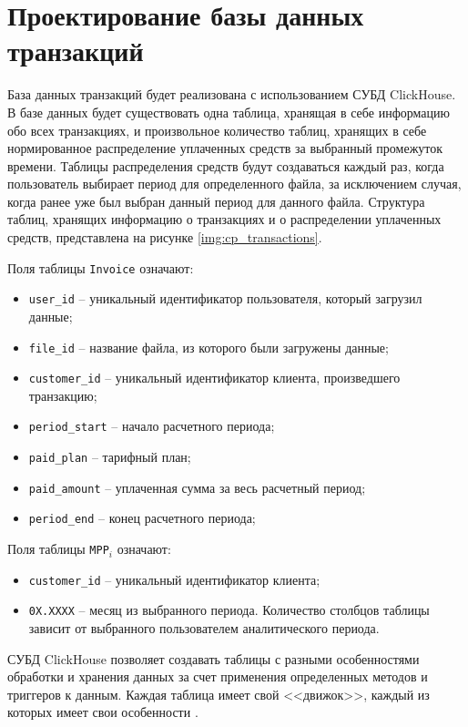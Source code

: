\section{Проектирование базы данных транзакций}

База данных транзакций будет реализована с использованием СУБД ClickHouse. В базе данных будет существовать одна таблица, хранящая в себе информацию обо всех транзакциях, и произвольное количество таблиц, хранящих в себе нормированное распределение уплаченных средств за выбранный промежуток времени. Таблицы распределения средств будут создаваться каждый раз, когда пользователь выбирает период для определенного файла, за исключением случая, когда ранее уже был выбран данный период для данного файла. Структура таблиц, хранящих информацию о транзакциях и о распределении уплаченных средств, представлена на рисунке \ref{img:cp_transactions}.


Поля таблицы \texttt{Invoice} означают:

\begin{itemize}
	\item \texttt{user\_id} -- уникальный идентификатор пользователя, который загрузил данные;
	\item \texttt{file\_id} -- название файла, из которого были загружены данные;
	\item \texttt{customer\_id} -- уникальный идентификатор клиента, произведшего транзакцию;
	\item \texttt{period\_start} -- начало расчетного периода;
	\item \texttt{paid\_plan} -- тарифный план;
	\item \texttt{paid\_amount} -- уплаченная сумма за весь расчетный период;
	\item \texttt{period\_end} -- конец расчетного периода;
\end{itemize}

Поля таблицы \texttt{MPP$_i$} означают:

\begin{itemize}
	\item \texttt{customer\_id} -- уникальный идентификатор клиента;
	\item \texttt{0X.XXXX} -- месяц из выбранного периода. Количество столбцов таблицы зависит от выбранного пользователем аналитического периода.
\end{itemize}

СУБД ClickHouse позволяет создавать таблицы с разными особенностями обработки и хранения данных за счет применения определенных методов и триггеров к данным. Каждая таблица имеет свой <<движок>>, каждый из которых имеет свои особенности \cite{chengines}.

